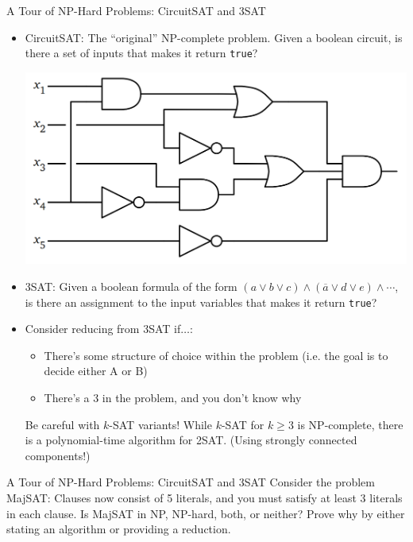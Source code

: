 \documentclass{beamer}
\begin{document}
\begin{frame}[t]{A Tour of NP-Hard Problems: CircuitSAT and 3SAT}
    \begin{itemize}
        \item \alert{CircuitSAT}: The ``original'' NP-complete problem. Given a boolean circuit, is there a set of inputs that makes it return \texttt{true}?
            \begin{center}
                \includegraphics[height=.2\textwidth]{csat.PNG}
            \end{center}
        \item \pause \alert{3SAT}: Given a boolean formula of the form $(a \vee b \vee c) \wedge (\overline{a} \vee d \vee e) \wedge \dotsb$, is there an assignment to the input variables that makes it return \texttt{true}?
        \item \pause Consider reducing from 3SAT if$\dotsc$:
        \begin{itemize}
            \item \pause There's some structure of choice within the problem (i.e. the goal is to decide either A or B)
            \item  \pause There's a 3 in the problem, and you don't know why
        \end{itemize}
        \pause
        \begin{alertblock}{Be careful with $k$-SAT variants!}
            While $k$-SAT for $k \geq 3$ is NP-complete, there is a polynomial-time algorithm for 2SAT. (Using strongly connected components!)
        \end{alertblock}
    \end{itemize}
\end{frame}

\begin{frame}[t]{A Tour of NP-Hard Problems: CircuitSAT and 3SAT}
    Consider the problem \alert{MajSAT}: Clauses now consist of 5 literals, and you must satisfy at least 3 literals in each clause. Is \alert{MajSAT} in NP, NP-hard, both, or neither? Prove why by either stating an algorithm or providing a reduction.
\end{frame}
\end{document}
